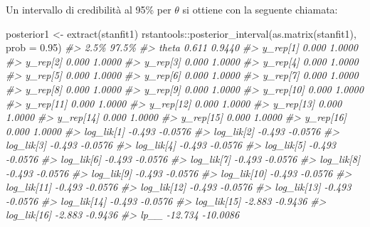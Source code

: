 \documentclass[
  10pt,
  italian,
  a4paper,
  extrafontsizes,onecolumn,openright
  ]{memoir}
\newenvironment{Shaded}{\begin{snugshade}}{\end{snugshade}}
\newcommand{\AttributeTok}[1]{\textcolor[rgb]{0.77,0.63,0.00}{#1}}
\newcommand{\CommentTok}[1]{\textcolor[rgb]{0.56,0.35,0.01}{\textit{#1}}}
\newcommand{\FloatTok}[1]{\textcolor[rgb]{0.00,0.00,0.81}{#1}}
\newcommand{\FunctionTok}[1]{\textcolor[rgb]{0.00,0.00,0.00}{#1}}
\newcommand{\NormalTok}[1]{#1}
\newcommand{\OtherTok}[1]{\textcolor[rgb]{0.56,0.35,0.01}{#1}}
\newcommand{\SpecialCharTok}[1]{\textcolor[rgb]{0.00,0.00,0.00}{#1}}
\begin{document}
Un intervallo di credibilità al 95\% per \(\theta\) si ottiene con la seguente chiamata:

\begin{Shaded}
\begin{Highlighting}[]
\NormalTok{posterior1 }\OtherTok{\textless{}{-}} \FunctionTok{extract}\NormalTok{(stanfit1)}
\NormalTok{rstantools}\SpecialCharTok{::}\FunctionTok{posterior\_interval}\NormalTok{(}\FunctionTok{as.matrix}\NormalTok{(stanfit1), }\AttributeTok{prob =} \FloatTok{0.95}\NormalTok{)}
\CommentTok{\#\textgreater{}                2.5\%    97.5\%}
\CommentTok{\#\textgreater{} theta         0.611   0.9440}
\CommentTok{\#\textgreater{} y\_rep[1]      0.000   1.0000}
\CommentTok{\#\textgreater{} y\_rep[2]      0.000   1.0000}
\CommentTok{\#\textgreater{} y\_rep[3]      0.000   1.0000}
\CommentTok{\#\textgreater{} y\_rep[4]      0.000   1.0000}
\CommentTok{\#\textgreater{} y\_rep[5]      0.000   1.0000}
\CommentTok{\#\textgreater{} y\_rep[6]      0.000   1.0000}
\CommentTok{\#\textgreater{} y\_rep[7]      0.000   1.0000}
\CommentTok{\#\textgreater{} y\_rep[8]      0.000   1.0000}
\CommentTok{\#\textgreater{} y\_rep[9]      0.000   1.0000}
\CommentTok{\#\textgreater{} y\_rep[10]     0.000   1.0000}
\CommentTok{\#\textgreater{} y\_rep[11]     0.000   1.0000}
\CommentTok{\#\textgreater{} y\_rep[12]     0.000   1.0000}
\CommentTok{\#\textgreater{} y\_rep[13]     0.000   1.0000}
\CommentTok{\#\textgreater{} y\_rep[14]     0.000   1.0000}
\CommentTok{\#\textgreater{} y\_rep[15]     0.000   1.0000}
\CommentTok{\#\textgreater{} y\_rep[16]     0.000   1.0000}
\CommentTok{\#\textgreater{} log\_lik[1]   {-}0.493  {-}0.0576}
\CommentTok{\#\textgreater{} log\_lik[2]   {-}0.493  {-}0.0576}
\CommentTok{\#\textgreater{} log\_lik[3]   {-}0.493  {-}0.0576}
\CommentTok{\#\textgreater{} log\_lik[4]   {-}0.493  {-}0.0576}
\CommentTok{\#\textgreater{} log\_lik[5]   {-}0.493  {-}0.0576}
\CommentTok{\#\textgreater{} log\_lik[6]   {-}0.493  {-}0.0576}
\CommentTok{\#\textgreater{} log\_lik[7]   {-}0.493  {-}0.0576}
\CommentTok{\#\textgreater{} log\_lik[8]   {-}0.493  {-}0.0576}
\CommentTok{\#\textgreater{} log\_lik[9]   {-}0.493  {-}0.0576}
\CommentTok{\#\textgreater{} log\_lik[10]  {-}0.493  {-}0.0576}
\CommentTok{\#\textgreater{} log\_lik[11]  {-}0.493  {-}0.0576}
\CommentTok{\#\textgreater{} log\_lik[12]  {-}0.493  {-}0.0576}
\CommentTok{\#\textgreater{} log\_lik[13]  {-}0.493  {-}0.0576}
\CommentTok{\#\textgreater{} log\_lik[14]  {-}0.493  {-}0.0576}
\CommentTok{\#\textgreater{} log\_lik[15]  {-}2.883  {-}0.9436}
\CommentTok{\#\textgreater{} log\_lik[16]  {-}2.883  {-}0.9436}
\CommentTok{\#\textgreater{} lp\_\_        {-}12.734 {-}10.0086}
\end{Highlighting}
\end{Shaded}
\end{document}
